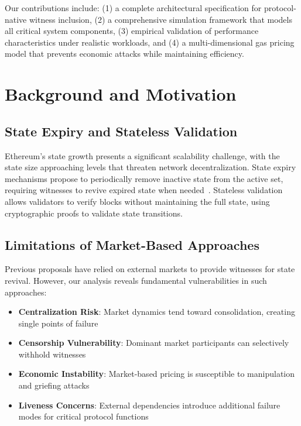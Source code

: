 \documentclass{article}
\begin{document}
Our contributions include: (1) a complete architectural specification for protocol-native witness inclusion, (2) a comprehensive simulation framework that models all critical system components, (3) empirical validation of performance characteristics under realistic workloads, and (4) a multi-dimensional gas pricing model that prevents economic attacks while maintaining efficiency.

\section{Background and Motivation}

\subsection{State Expiry and Stateless Validation}

Ethereum's state growth presents a significant scalability challenge, with the state size approaching levels that threaten network decentralization. State expiry mechanisms propose to periodically remove inactive state from the active set, requiring witnesses to revive expired state when needed~\cite{buterin2021statelessness}. Stateless validation allows validators to verify blocks without maintaining the full state, using cryptographic proofs to validate state transitions.

\subsection{Limitations of Market-Based Approaches}

Previous proposals have relied on external markets to provide witnesses for state revival. However, our analysis reveals fundamental vulnerabilities in such approaches:

\begin{itemize}
\item \textbf{Centralization Risk}: Market dynamics tend toward consolidation, creating single points of failure
\item \textbf{Censorship Vulnerability}: Dominant market participants can selectively withhold witnesses
\item \textbf{Economic Instability}: Market-based pricing is susceptible to manipulation and griefing attacks
\item \textbf{Liveness Concerns}: External dependencies introduce additional failure modes for critical protocol functions
\end{itemize}
\end{document}
